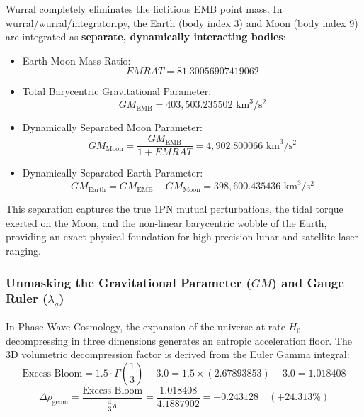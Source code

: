 \documentclass[11pt,a4paper]{article}
\begin{document}
Wurral completely eliminates the fictitious EMB point mass. In \url{wurral/wurral/integrator.py}, the Earth (body index 3) and Moon (body index 9) are integrated as \textbf{separate, dynamically interacting bodies}:
\begin{itemize}
    \item Earth-Moon Mass Ratio:
    \begin{equation}
    EMRAT = 81.30056907419062
    \label{eq:emrat_ratio}
    \end{equation}
    \item Total Barycentric Gravitational Parameter:
    \begin{equation}
    GM_{\text{EMB}} = 403{,}503.235502\text{ km}^3/\text{s}^2
    \label{eq:gm_emb}
    \end{equation}
    \item Dynamically Separated Moon Parameter:
    \begin{equation}
    GM_{\text{Moon}} = \frac{GM_{\text{EMB}}}{1 + EMRAT} = 4{,}902.800066\text{ km}^3/\text{s}^2
    \label{eq:gm_moon}
    \end{equation}
    \item Dynamically Separated Earth Parameter:
    \begin{equation}
    GM_{\text{Earth}} = GM_{\text{EMB}} - GM_{\text{Moon}} = 398{,}600.435436\text{ km}^3/\text{s}^2
    \label{eq:gm_earth}
    \end{equation}
\end{itemize}

This separation captures the true 1PN mutual perturbations, the tidal torque exerted on the Moon, and the non-linear barycentric wobble of the Earth, providing an exact physical foundation for high-precision lunar and satellite laser ranging.

\subsubsection{Unmasking the Gravitational Parameter ($GM$) and Gauge Ruler ($\lambda_g$)}
\label{subsubsec:gauge_ruler}

In Phase Wave Cosmology, the expansion of the universe at rate $H_0$ decompressing in three dimensions generates an entropic acceleration floor. The 3D volumetric decompression factor is derived from the Euler Gamma integral:
\begin{equation}
\text{Excess Bloom} = 1.5 \cdot \Gamma\left(\frac{1}{3}\right) - 3.0 = 1.5 \times (2.67893853) - 3.0 = 1.018408
\label{eq:excess_bloom}
\end{equation}
\begin{equation}
\Delta\rho_{\text{geom}} = \frac{\text{Excess Bloom}}{\frac{4}{3}\pi} = \frac{1.018408}{4.1887902} = +0.243128 \quad (+24.313\%)
\label{eq:drho_geom_wurral}
\end{equation}
\end{document}
